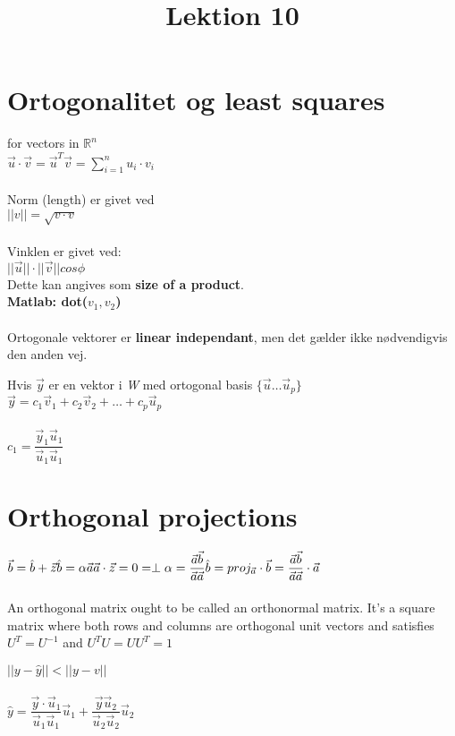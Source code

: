 \documentclass[danish, english]{article}
\title{Lektion 10}
\begin{document}
\maketitle

\section*{Ortogonalitet og least squares}
\begin{theo} 
for vectors in $\mathbb{R}^n$\\
$\vec{u}\cdot\vec{v} = \vec{u}^T\vec{v}=\sum \limits_{i=1}^n u_i\cdot v_i$
\\
\\
Norm (length) er givet ved \\
$||v||=\sqrt{v\cdot v}$
\\
\\
Vinklen er givet ved:\\
$||\vec{u}||\cdot ||\vec{v}|| cos\phi$\\
Dette kan angives som \textbf{size of a product}.
\\
\textbf{Matlab: dot($v_1,v_2$)}
\\
\\
Ortogonale vektorer er \textbf{linear independant}, men det gælder ikke nødvendigvis den anden vej.
\end{theo}

Hvis $\vec{y}$ er en vektor i \textit{W} med ortogonal basis $\{\vec{u} \dots \vec{u}_p\}$\\
$\vec{y}=c_1\vec{v}_1 + c_2\vec{v}_2 + \dots + c_p\vec{u}_p$
\\
\\
$c_1 = \dfrac{\vec{y}_1 \vec{u}_1}{\vec{u}_1 \vec{u}_1}$




\newpage
\section*{Orthogonal projections}
\begin{theo} 
$\vec{b} = \hat{b} + \vec{z}\\
\hat{b} = \alpha\vec{a}\\
\vec{a}\cdot \vec{z} = 0= \perp\\
\alpha = \dfrac{\vec{a}\vec{b}}{\vec{a}\vec{a}}  \\
\hat{b} = proj_{\vec{a}} \cdot \vec{b}=\dfrac{\vec{a}\vec{b}}{\vec{a}\vec{a}}\cdot \vec{a}$
\\
\\
An orthogonal matrix ought to be called an orthonormal matrix. It's a square matrix where both rows and columns are orthogonal unit vectors and satisfies $U^T = U^{-1}$ and $U^TU=UU^T = 1$
\end{theo}


\begin{theo} 
$||y-\hat{y}||<||y-v||$
\\
\\
$\hat{y}=\dfrac{\vec{y} \cdot \vec{u}_1}{\vec{u}_1 \vec{u}_1} \vec{u}_1 + \dfrac{\vec{y} \vec{u}_2}{\vec{u}_2 \vec{u}_2} \vec{u}_2$
\end{theo}
\end{document}

